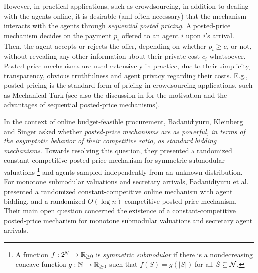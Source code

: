 However, in practical applications, such as crowdsourcing, in addition to dealing with the agents online, it is desirable (and often necessary) that the mechanism interacts with the agents through \emph{sequential posted pricing}. 
%
A posted-price mechanism decides on the payment $p_i$ offered to an agent $i$ upon $i$'s arrival. Then, the agent accepts or rejects the offer, depending on whether $p_i \geq c_i$ or not, without revealing any other information about their private cost $c_i$ whatsoever. 
%
Posted-price mechanisms are used extensively in practice, due to their simplicity, transparency, obvious truthfulness \cite{Li2017} and agent privacy regarding their costs. E.g., posted pricing is the standard form of pricing in crowdsourcing applications, such as Mechanical Turk (see also the discussion in \cite{BalkHart16,ChawlaHMS2010} for the motivation and the advantages of sequential posted-price mechanisms). 

%
%

In the context of online budget-feasible procurement, Badanidiyuru, Kleinberg and Singer \cite{Bada2012} asked whether \emph{posted-price mechanisms are as powerful, in terms of the asymptotic behavior of their competitive ratio, as standard bidding mechanisms}. Towards resolving this question, they presented a randomized constant-competitive posted-price mechanism for symmetric submodular valuations%
%
\footnote{A function $f : 2^{\mathcal{N}} \to \mathbb{R}_{\geq 0}$ is \emph{symmetric submodular} if there is a nondecreasing concave function $g:\mathbb{N} \to \mathbb{R}_{\geq 0}$ such that $f(S) = g(|S|)$ for all $S \subseteq \mathcal{N}$.}
%
and agents sampled independently from an unknown distribution. For monotone submodular valuations and secretary arrivals, Badanidiyuru et al. \cite{Bada2012} presented a randomized constant-competitive  online mechanism with agent bidding, and a randomized $O(\log n)$-competitive posted-price mechanism. Their main open question concerned the existence of a constant-competitive posted-price mechanism for monotone submodular valuations and secretary agent arrivals. 

